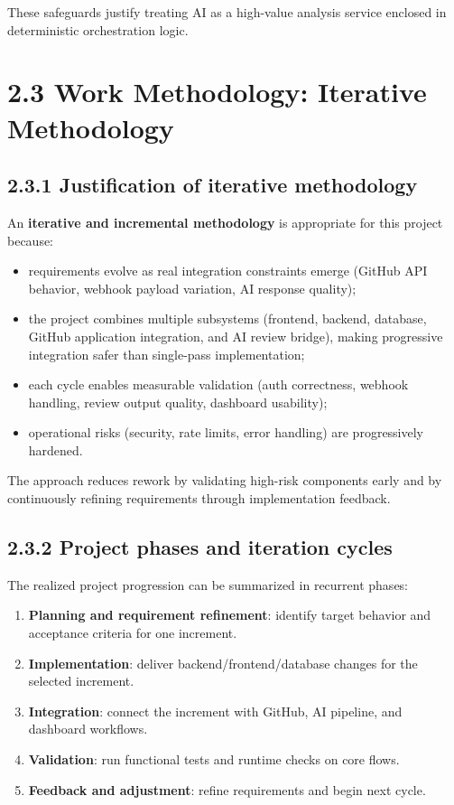 These safeguards justify treating AI as a high-value analysis service enclosed in deterministic orchestration logic.

\section{2.3 Work Methodology: Iterative Methodology}

\subsection{2.3.1 Justification of iterative methodology}

An \textbf{iterative and incremental methodology} is appropriate for this project because:
\begin{itemize}
    \item requirements evolve as real integration constraints emerge (GitHub API behavior, webhook payload variation, AI response quality);
    \item the project combines multiple subsystems (frontend, backend, database, GitHub application integration, and AI review bridge), making progressive integration safer than single-pass implementation;
    \item each cycle enables measurable validation (auth correctness, webhook handling, review output quality, dashboard usability);
    \item operational risks (security, rate limits, error handling) are progressively hardened.
\end{itemize}

The approach reduces rework by validating high-risk components early and by continuously refining requirements through implementation feedback.

\subsection{2.3.2 Project phases and iteration cycles}

The realized project progression can be summarized in recurrent phases:
\begin{enumerate}
    \item \textbf{Planning and requirement refinement}: identify target behavior and acceptance criteria for one increment.
    \item \textbf{Implementation}: deliver backend/frontend/database changes for the selected increment.
    \item \textbf{Integration}: connect the increment with GitHub, AI pipeline, and dashboard workflows.
    \item \textbf{Validation}: run functional tests and runtime checks on core flows.
    \item \textbf{Feedback and adjustment}: refine requirements and begin next cycle.
\end{enumerate}


